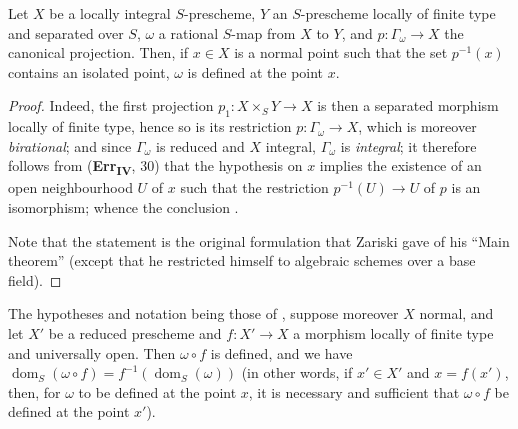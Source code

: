 \begin{proposition}[20.4.4]
\label{IV.20.4.4}
Let $X$ be a locally integral $S$-prescheme, $Y$ an $S$-prescheme locally of finite type and separated over $S$, $\omega$ a rational $S$-map from $X$ to $Y$, and $p:\Gamma_\omega\to X$ the canonical projection.
Then, if $x\in X$ is a normal point such that the set $p^{-1}(x)$ contains an isolated point, $\omega$ is defined at the point $x$.
\end{proposition}

\begin{proof}
Indeed, the first projection $p_1:X\times_S Y\to X$ is then a separated morphism locally of finite type, hence so is its restriction $p:\Gamma_\omega\to X$, which is moreover \emph{birational}; and since $\Gamma_\omega$ is reduced and $X$ integral, $\Gamma_\omega$ is \emph{integral}; it therefore follows from (\textbf{Err}\textsubscript{\textbf{IV}}, 30) that the hypothesis on $x$ implies the existence of an open neighbourhood $U$ of $x$ such that the restriction $p^{-1}(U)\to U$ of $p$ is an isomorphism; whence the conclusion .

Note that the statement  is the original formulation that Zariski gave of his ``Main theorem'' (except that he restricted himself to algebraic schemes over a base field).
\end{proof}

\begin{proposition}[20.4.5]
\label{IV.20.4.5}
The hypotheses and notation being those of , suppose moreover $X$ normal, and let $X'$ be a reduced prescheme and $f:X'\to X$ a morphism locally of finite type and universally open.
Then $\omega\circ f$ is defined, and we have $\operatorname{dom}_S(\omega\circ f)=f^{-1}(\operatorname{dom}_S(\omega))$ (in other words, if $x'\in X'$ and $x=f(x')$, then, for $\omega$ to be defined at the point $x$, it is necessary and sufficient that $\omega\circ f$ be defined at the point $x'$).
\end{proposition}

